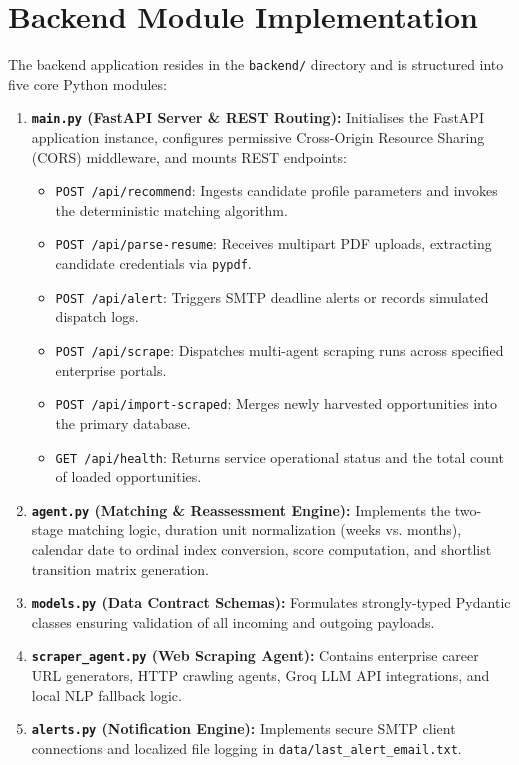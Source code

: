 \section{Backend Module Implementation} \label{S5.2}
The backend application resides in the \texttt{backend/} directory and is structured into five core Python modules:

\begin{enumerate}[label=\textbf{\arabic*.}]
	\item \textbf{\texttt{main.py} (FastAPI Server \& REST Routing):} Initialises the FastAPI application instance, configures permissive Cross-Origin Resource Sharing (CORS) middleware, and mounts REST endpoints:
	\begin{itemize}
		\item \texttt{POST /api/recommend}: Ingests candidate profile parameters and invokes the deterministic matching algorithm.
		\item \texttt{POST /api/parse-resume}: Receives multipart PDF uploads, extracting candidate credentials via \texttt{pypdf}.
		\item \texttt{POST /api/alert}: Triggers SMTP deadline alerts or records simulated dispatch logs.
		\item \texttt{POST /api/scrape}: Dispatches multi-agent scraping runs across specified enterprise portals.
		\item \texttt{POST /api/import-scraped}: Merges newly harvested opportunities into the primary database.
		\item \texttt{GET /api/health}: Returns service operational status and the total count of loaded opportunities.
	\end{itemize}
	\item \textbf{\texttt{agent.py} (Matching \& Reassessment Engine):} Implements the two-stage matching logic, duration unit normalization (weeks vs. months), calendar date to ordinal index conversion, score computation, and shortlist transition matrix generation.
	\item \textbf{\texttt{models.py} (Data Contract Schemas):} Formulates strongly-typed Pydantic classes ensuring validation of all incoming and outgoing payloads.
	\item \textbf{\texttt{scraper\_agent.py} (Web Scraping Agent):} Contains enterprise career URL generators, HTTP crawling agents, Groq LLM API integrations, and local NLP fallback logic.
	\item \textbf{\texttt{alerts.py} (Notification Engine):} Implements secure SMTP client connections and localized file logging in \texttt{data/last\_alert\_email.txt}.
\end{enumerate}

